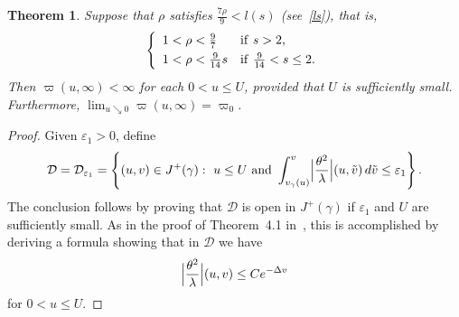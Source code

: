 \documentclass[a4paper,11pt,oneside,reqno]{amsart}
\newcommand{\s}{s}
\newtheorem{Thm}{Theorem}[section]
\newcommand{\cal}{\mathcal}
\newcommand{\eps}{\varepsilon}
\newcommand{\gam}{\gamma}
\newcommand{\vgam}{v_{\gam}}
\newcommand{\cD}{{\cal D}}
\begin{document}
\begin{Thm}\label{no_mass}
Suppose that\/ $\rho$ satisfies $\frac{7\rho}{9}<l(s)$ (see~\eqref{ls}), that is,
\begin{equation}\label{ls2}
\left\{
\begin{array}{ll}
1<\rho<\frac{9}{7}&{\rm if}\ \s>2,\\
\vspace{-3mm}\\
1<\rho<\frac{9}{14}\s
&{\rm if}\ \frac{9}{14}<s\leq 2.
\end{array}
\right.
\end{equation}
Then $\varpi(u,\infty)<\infty$ for each $0<u\leq U$, provided that $U$ is sufficiently small. Furthermore,\/ $\lim_{u\searrow 0}\varpi(u,\infty)=\varpi_0$.
\end{Thm}
\begin{proof}
Given $\eps_1>0$, define
\begin{eqnarray*}
{\cal D}=
{\cal D}_{\eps_1}=\left\{(u,v)\in J^+(\gamma):\ u\leq U\/\ {\rm and}\   
\int_{\vgam(u)}^v\Bigl| \frac{\theta^2}{\lambda} \Bigr|(u,\tilde v)\,d\tilde v\leq \eps_1\right\}.
\end{eqnarray*}
The conclusion follows by proving that $\cD$ is open in $J^+(\gamma)$ if $\eps_1$ and $U$ are sufficiently small.
As in the proof of Theorem~4.1 in~\cite{relIst3}, this is accomplished 
by deriving a formula showing that in $\cD$ we have
\begin{equation}\label{exponent_delta}
\Bigl|\frac{\theta^2}{\lambda}\Bigr|(u,v)\leq Ce^{-\Delta v}
\end{equation}
for $0<u\leq U$.


\end{proof}
\end{document}
